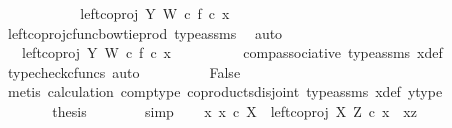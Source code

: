 \begin{isabellebody}
\ \ \ \ \ \ \isamarkupfalse%
\ \isamarkupfalse%
\ {\isachardoublequoteopen}{\isachardot}{\kern0pt}{\isachardot}{\kern0pt}{\isachardot}{\kern0pt}\ {\isacharequal}{\kern0pt}\ {\isacharparenleft}{\kern0pt}left{\isacharunderscore}{\kern0pt}coproj\ Y\ W\ {\isasymcirc}\isactrlsub c\ f{\isacharparenright}{\kern0pt}\ {\isasymcirc}\isactrlsub c\ x{\isachardoublequoteclose}\isanewline
\ \ \ \ \ \ \ \ \isamarkupfalse%
\ left{\isacharunderscore}{\kern0pt}coproj{\isacharunderscore}{\kern0pt}cfunc{\isacharunderscore}{\kern0pt}bowtie{\isacharunderscore}{\kern0pt}prod\ type{\isacharunderscore}{\kern0pt}assms\ \isamarkupfalse%
\ auto\isanewline
\ \ \ \ \ \ \isamarkupfalse%
\ \isamarkupfalse%
\ {\isachardoublequoteopen}{\isachardot}{\kern0pt}{\isachardot}{\kern0pt}{\isachardot}{\kern0pt}\ {\isacharequal}{\kern0pt}\ left{\isacharunderscore}{\kern0pt}coproj\ Y\ W\ {\isasymcirc}\isactrlsub c\ f\ {\isasymcirc}\isactrlsub c\ x{\isachardoublequoteclose}\isanewline
\ \ \ \ \ \ \ \ \isamarkupfalse%
\ comp{\isacharunderscore}{\kern0pt}associative{}\ type{\isacharunderscore}{\kern0pt}assms{\isacharparenleft}{\kern0pt}{}{\isacharparenright}{\kern0pt}\ x{\isacharunderscore}{\kern0pt}def\ \isamarkupfalse%
\ {\isacharparenleft}{\kern0pt}typecheck{\isacharunderscore}{\kern0pt}cfuncs{\isacharcomma}{\kern0pt}\ auto{\isacharparenright}{\kern0pt}\isanewline
\ \ \ \ \ \ \isamarkupfalse%
\ \isamarkupfalse%
\ False\isanewline
\ \ \ \ \ \ \ \ \isamarkupfalse%
\ {\isacharparenleft}{\kern0pt}metis\ calculation\ comp{\isacharunderscore}{\kern0pt}type\ coproducts{\isacharunderscore}{\kern0pt}disjoint\ type{\isacharunderscore}{\kern0pt}assms{\isacharparenleft}{\kern0pt}{}{\isacharparenright}{\kern0pt}\ x{\isacharunderscore}{\kern0pt}def\ y{\isacharunderscore}{\kern0pt}type{}{\isacharparenright}{\kern0pt}\isanewline
\ \ \ \ \isamarkupfalse%
\isanewline
\ \ \ \ \isamarkupfalse%
\ \isamarkupfalse%
\ {\isacharquery}{\kern0pt}thesis\isanewline
\ \ \ \ \ \ \isamarkupfalse%
\ simp\isanewline
{}\isamarkupfalse%
\isanewline
\ \ \isamarkupfalse%
\ {\isachardoublequoteopen}{\isasymnexists}x{\isachardot}{\kern0pt}\ x\ {\isasymin}\isactrlsub c\ X\ {\isasymand}\ left{\isacharunderscore}{\kern0pt}coproj\ X\ Z\ {\isasymcirc}\isactrlsub c\ x\ {\isacharequal}{\kern0pt}\ xz{\isachardoublequoteclose}\isanewline

\end{isabellebody}
